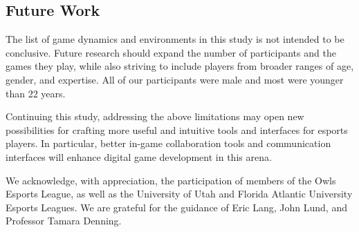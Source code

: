 \documentclass[11pt,manuscript,screen,review]{acmart} %
\begin{document}
\subsection{Future Work}

The list of game dynamics and environments in this study is not intended to be conclusive. Future research should expand the number of participants and the games they play, while also striving to include players from broader ranges of age, gender, and expertise. All of our participants were male and most were younger than 22 years.

Continuing this study, addressing the above limitations may open new possibilities for crafting more useful and intuitive tools and interfaces for esports players. In particular, better in-game collaboration tools and communication interfaces will enhance digital game development in this arena.

\begin{acks} 
    We acknowledge, with appreciation, the participation of members of the Owls Esports League, as well as the University of Utah and Florida Atlantic University Esports Leagues. We are grateful for the guidance of Eric Lang, John Lund, and Professor Tamara Denning. 
\end{acks}



\end{document}
